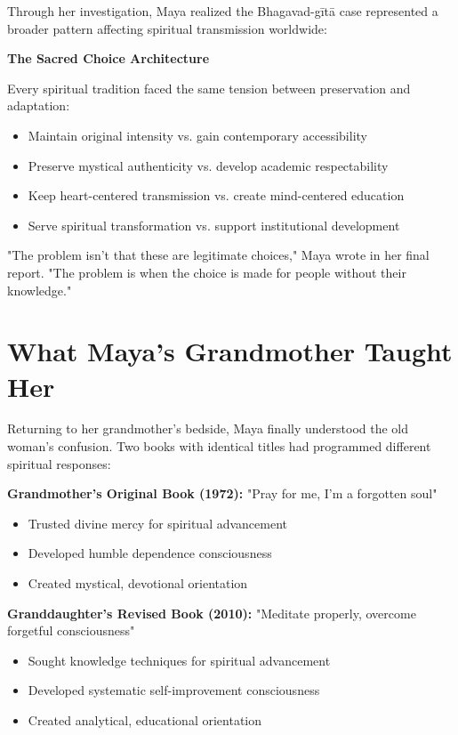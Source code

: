 \documentclass[11pt,twoside]{book}
\begin{document}
Through her investigation, Maya realized the Bhagavad-gītā case represented a broader pattern affecting spiritual transmission worldwide:

\textbf{\textbf{The Sacred Choice Architecture}}

Every spiritual tradition faced the same tension between preservation and adaptation:
\begin{itemize}
\item Maintain original intensity vs. gain contemporary accessibility
\item Preserve mystical authenticity vs. develop academic respectability
\item Keep heart-centered transmission vs. create mind-centered education
\item Serve spiritual transformation vs. support institutional development
\end{itemize}

"The problem isn't that these are legitimate choices," Maya wrote in her final report. "The problem is when the choice is made for people without their knowledge."
\section*{What Maya's Grandmother Taught Her}
\label{sec:orgf56750c}

Returning to her grandmother's bedside, Maya finally understood the old woman's confusion. Two books with identical titles had programmed different spiritual responses:

\textbf{\textbf{Grandmother's Original Book (1972):}}
"Pray for me, I'm a forgotten soul"
\begin{itemize}
\item Trusted divine mercy for spiritual advancement
\item Developed humble dependence consciousness
\item Created mystical, devotional orientation
\end{itemize}

\textbf{\textbf{Granddaughter's Revised Book (2010):}}
"Meditate properly, overcome forgetful consciousness"  
\begin{itemize}
\item Sought knowledge techniques for spiritual advancement
\item Developed systematic self-improvement consciousness
\item Created analytical, educational orientation
\end{itemize}
\end{document}
